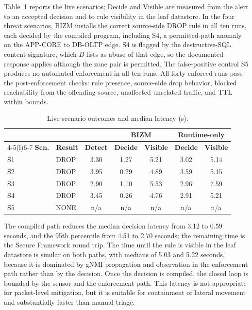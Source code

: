 \documentclass[final,5p]{elsarticle}
\begin{document}
Table~\ref{tab:functional} reports the live scenarios; Decide and Visible are measured from the alert to an accepted decision and to rule visibility in the leaf datastore. In the four threat scenarios, BIZM installs the correct source-side DROP rule in all ten runs, each decided by the compiled program, including S4, a permitted-path anomaly on the APP-CORE to DB-OLTP edge. S4 is flagged by the destructive-SQL content signature, which $B$ lists as abuse of that edge, so the documented response applies although the zone pair is permitted. The false-positive control S5 produces no automated enforcement in all ten runs. All forty enforced runs pass the post-enforcement checks: rule presence, source-side drop behavior, blocked reachability from the offending source, unaffected unrelated traffic, and TTL within bounds.

\begin{table}[t]
    \centering
    \caption{Live scenario outcomes and median latency (s).}
    \label{tab:functional}
    \small
    \setlength{\tabcolsep}{3.2pt}
    \begin{tabular}{@{}llccccc@{}}
        \toprule
        & & & \multicolumn{2}{c}{\textbf{BIZM}} & \multicolumn{2}{c}{\textbf{Runtime-only}} \\
        \cmidrule(lr){4-5}\cmidrule(l){6-7}
        \textbf{Scn.} & \textbf{Result} & \textbf{Detect} & \textbf{Decide} & \textbf{Visible} & \textbf{Decide} & \textbf{Visible} \\
        \midrule
        S1 & DROP & 3.30 & 1.27 & 5.21 & 3.02 & 5.14 \\
        S2 & DROP & 3.95 & 0.29 & 4.89 & 3.59 & 5.15 \\
        S3 & DROP & 2.90 & 1.10 & 5.53 & 2.96 & 7.59 \\
        S4 & DROP & 3.45 & 0.26 & 4.76 & 2.91 & 5.21 \\
        S5 & NONE & n/a  & n/a  & n/a  & n/a  & n/a  \\
        \bottomrule
    \end{tabular}
\end{table}

The compiled path reduces the median decision latency from 3.12 to 0.59 seconds, and the 95th percentile from 4.51 to 2.70 seconds; the remaining time is the Secure Framework round trip. The time until the rule is visible in the leaf datastore is similar on both paths, with medians of 5.03 and 5.22 seconds, because it is dominated by gNMI propagation and observation in the enforcement path rather than by the decision. Once the decision is compiled, the closed loop is bounded by the sensor and the enforcement path. This latency is not appropriate for packet-level mitigation, but it is suitable for containment of lateral movement and substantially faster than manual triage.
\end{document}
